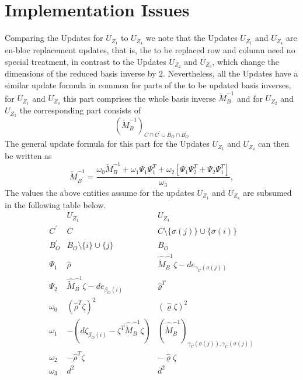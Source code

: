 \documentclass[a4paper]{article}
\begin{document}
\section{Implementation Issues}
Comparing the Updates for $U_{Z_{1}}$ to $U_{Z_{4}}$ we note that the Updates
$U_{Z_{1}}$ and $U_{Z_{4}}$ are en-bloc replacement updates, that is, the to be
replaced row and column need no special treatment, in contrast to the Updates
$U_{Z_{2}}$ and $U_{Z_{3}}$, which change the dimensions of the reduced basis
inverse by $2$. Nevertheless, all the Updates have a similar update
formula in common for parts of the to be updated basis inverses,
for $U_{Z_{1}}$ and $U_{Z_{4}}$ this part comprises the whole
basis inverse $\check{M}_{B}^{-1}$ and for $U_{Z_{2}}$
and $U_{Z_{3}}$ the corresponding part consists of  
\begin{equation}
\left(
 \check{M}_{B}^{-1}
\right)_{C \cap C^{\prime} \cup B_{O} \cap B_{O}^{\prime}}
\end{equation}
The general update formula for this part for the Updates
$U_{Z_{1}}$ and $U_{Z_{4}}$ can then be written as 
\begin{equation}
\check{M}_{B^{\prime}}^{-1}
=
\frac{
\omega_{0}\check{M}_{B}^{-1}
+\omega_{1}\Psi_{1}\Psi_{1}^{T}
+\omega_{2}\left[\Psi_{1}\Psi_{2}^{T}+\Psi_{2}\Psi_{1}^{T}\right]
}{\omega_{3}},
\end{equation}
The values the above entities assume for the updates $U_{Z_{1}}$ and
$U_{Z_{4}}$ are subsumed in the following table below.
\begin{equation}
\begin{array}{c|cc}
& U_{Z_{1}} & U_{Z_{4}} \\
\hline
C^{\prime}
& C
& C \setminus \{\sigma(j)\} \cup \{\sigma(i)\}
\\
B_{O}^{\prime}
& B_{O} \setminus \{i\} \cup \{j\}
& B_{O}
\\
\Psi_{1}
& \hat{\rho}
& \hat{\check{M}}_{B}^{-1}\zeta-de_{\gamma_{C}(\sigma(j))}
\\
\Psi_{2}
& \hat{\check{M}}_{B}^{-1}\zeta-de_{\beta_{O}(i)}
& \hat{\varrho}^{T}
\\
\omega_{0}
& \left(\hat{\rho}^{T}\zeta\right)^{2}
& \left(\hat{\varrho}\zeta\right)^{2}
\\
\omega_{1}
& -\left(
   d\zeta_{\beta_{O}(i)}-\zeta^{T}\hat{\check{M}}_{B}^{-1}\zeta
  \right) 
& \left(
   \hat{\check{M}}_{B}^{-1}
  \right)_{\gamma_{C}(\sigma(j)), \gamma_{C}(\sigma(j))} 
\\
\omega_{2}
& -\hat{\rho}^{T}\zeta
& -\hat{\varrho}\zeta
\\
\omega_{3}
& d^{2}
& d^{2}
\end{array}
\end{equation}
 
\end{document}
